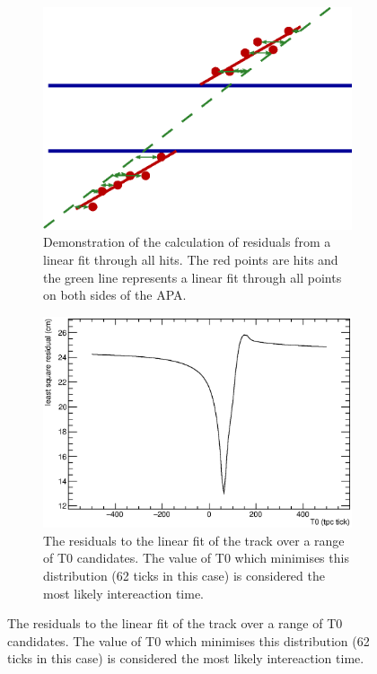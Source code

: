 \begin{figure}[p]

  \centering

  \begin{subfigure}[t]{0.48\linewidth}
    \centering
    \includegraphics[width=\textwidth]{track_residual.eps}
    \caption{Demonstration of the calculation of residuals from a linear fit through all hits.  The red points are hits and the green line represents a linear fit through all points on both sides of the APA.}
    \label{fig:APACrossingAligmentLeastSqResidual}
  \end{subfigure}
  \hfill
  \begin{subfigure}[t]{0.48\linewidth}
    \centering
    \includegraphics[width=\textwidth]{chisquare.eps}
    \caption{The residuals to the linear fit of the track over a range of T0 candidates.  The value of T0 which minimises this distribution (62 ticks in this case) is considered the most likely intereaction time.}

\end{subfigure}
\end{figure}
